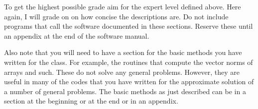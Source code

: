 \noindent To get the highest possible grade aim for the expert level defined
above. Here again, I will grade on on how concise the descriptions are. Do not
include programs that call the software documented in these sections. Reserve
these until an appendix at the end of the software manual.

Also note that you will need to have a section for the basic methods you have
written for the class. For example, the routines that compute the vector norms
of arrays and such. These do not solve any general problems. However, they are
useful in many of the codes that you have written for the approximate solution
of a number of general problems. The basic methods as just described can be in
a section at the beginning or at the end or in an appendix.

\newpage
